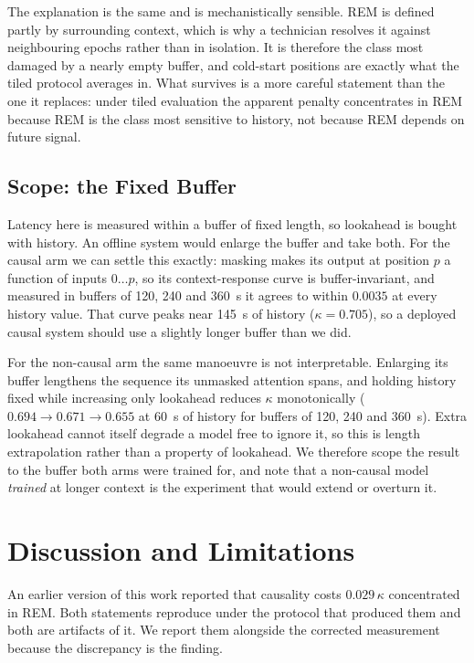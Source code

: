 \documentclass[conference]{IEEEtran}
\begin{document}
The explanation is the same and is mechanistically sensible. REM is defined partly by surrounding
context, which is why a technician resolves it against neighbouring epochs rather than in isolation.
It is therefore the class most damaged by a nearly empty buffer, and cold-start positions are
exactly what the tiled protocol averages in. What survives is a more careful statement than the one
it replaces: under tiled evaluation the apparent penalty concentrates in REM because REM is the
class most sensitive to history, not because REM depends on future signal.

\subsection{Scope: the Fixed Buffer}

Latency here is measured within a buffer of fixed length, so lookahead is bought with history. An
offline system would enlarge the buffer and take both. For the causal arm we can settle this
exactly: masking makes its output at position $p$ a function of inputs $0 \ldots p$, so its
context-response curve is buffer-invariant, and measured in buffers of 120, 240 and 360~s it agrees
to within $0.0035$ at every history value. That curve peaks near 145~s of history
($\kappa = 0.705$), so a deployed causal system should use a slightly longer buffer than we did.

For the non-causal arm the same manoeuvre is not interpretable. Enlarging its buffer lengthens the
sequence its unmasked attention spans, and holding history fixed while increasing only lookahead
reduces $\kappa$ monotonically ($0.694 \to 0.671 \to 0.655$ at 60~s of history for buffers of 120,
240 and 360~s). Extra lookahead cannot itself degrade a model free to ignore it, so this is length
extrapolation rather than a property of lookahead. We therefore scope the result to the buffer both
arms were trained for, and note that a non-causal model \emph{trained} at longer context is the
experiment that would extend or overturn it.

\section{Discussion and Limitations}

An earlier version of this work reported that causality costs $0.029\,\kappa$ concentrated in REM.
Both statements reproduce under the protocol that produced them and both are artifacts of it. We
report them alongside the corrected measurement because the discrepancy is the finding.
\end{document}
